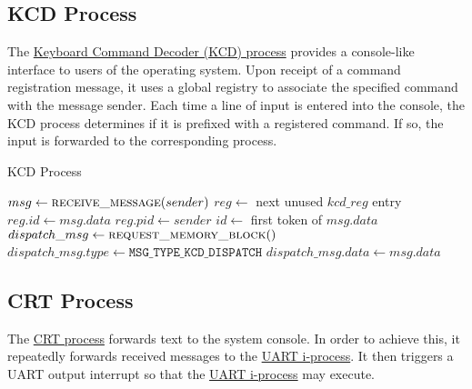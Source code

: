 \documentclass[12pt]{report}
\begin{document}
\subsection{KCD Process}

The \hyperref[alg:kcdprocess]{Keyboard Command Decoder (KCD) process} provides a console-like interface to users of the operating system. Upon receipt of a command registration message, it uses a global registry to associate the specified command with the message sender. Each time a line of input is entered into the console, the KCD process determines if it is prefixed with a registered command. If so, the input is forwarded to the corresponding process.\\

\begin{algorithm}
\caption{KCD Process}
\label{alg:kcdprocess}
\begin{algorithmic}[1]
        \State $msg \leftarrow \Call{receive\_message}{sender}$
            \State $reg \leftarrow$ next unused $kcd\_reg$ entry
            \State $reg.id \leftarrow msg.data$
            \State $reg.pid \leftarrow sender$
            \State $id \leftarrow$ first token of $msg.data$
                \State $dispatch\_msg \leftarrow \Call{request\_memory\_block}{\null}$
                \State $dispatch\_msg.type \leftarrow \texttt{MSG_TYPE_KCD_DISPATCH}$
                \State $dispatch\_msg.data \leftarrow msg.data$
                \State {}
            \EndIf
        \EndIf
        \State {}
    \EndWhile
\EndProcedure
\end{algorithmic}
\end{algorithm}

\subsection{CRT Process}

The \hyperref[alg:crtprocess]{CRT process} forwards text to the system console. In order to achieve this, it repeatedly forwards received messages to the \hyperref[subsec:UART I-Process]{UART i-process}. It then triggers a UART output interrupt so that the \hyperref[subsec:UART I-Process]{UART i-process} may execute.\\
\end{document}
